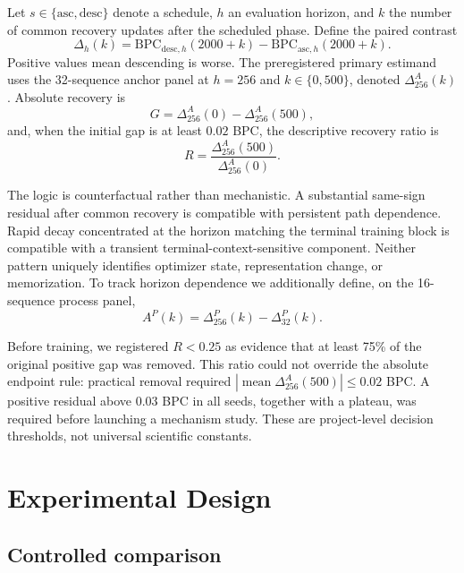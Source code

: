 \documentclass{article}
\begin{document}
Let $s\in\{\mathrm{asc},\mathrm{desc}\}$ denote a schedule, $h$ an evaluation horizon, and $k$ the number of common recovery updates after the scheduled phase. Define the paired contrast
\begin{equation}
\Delta_h(k)=\mathrm{BPC}_{\mathrm{desc},h}(2000+k)-
\mathrm{BPC}_{\mathrm{asc},h}(2000+k).
\end{equation}
Positive values mean descending is worse. The preregistered primary estimand uses the 32-sequence anchor panel at $h=256$ and $k\in\{0,500\}$, denoted $\Delta^A_{256}(k)$. Absolute recovery is
\begin{equation}
G=\Delta^A_{256}(0)-\Delta^A_{256}(500),
\end{equation}
and, when the initial gap is at least $0.02$ BPC, the descriptive recovery ratio is
\begin{equation}
R=\frac{\Delta^A_{256}(500)}{\Delta^A_{256}(0)}.
\end{equation}

The logic is counterfactual rather than mechanistic. A substantial same-sign residual after common recovery is compatible with persistent path dependence. Rapid decay concentrated at the horizon matching the terminal training block is compatible with a transient terminal-context-sensitive component. Neither pattern uniquely identifies optimizer state, representation change, or memorization. To track horizon dependence we additionally define, on the 16-sequence process panel,
\begin{equation}
A^P(k)=\Delta^P_{256}(k)-\Delta^P_{32}(k).
\end{equation}

Before training, we registered $R<0.25$ as evidence that at least 75\% of the original positive gap was removed. This ratio could not override the absolute endpoint rule: practical removal required $|\operatorname{mean}\Delta^A_{256}(500)|\leq0.02$ BPC. A positive residual above $0.03$ BPC in all seeds, together with a plateau, was required before launching a mechanism study. These are project-level decision thresholds, not universal scientific constants.

\section{Experimental Design}

\subsection{Controlled comparison}
\end{document}
